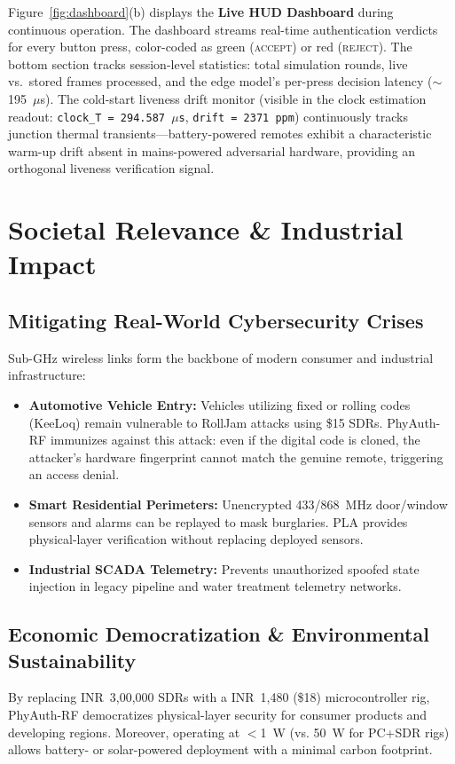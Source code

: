 \documentclass[11pt,a4paper]{article}
\begin{document}
\noindent Figure~\ref{fig:dashboard}(b) displays the \textbf{Live HUD Dashboard} during continuous operation. The dashboard streams real-time authentication verdicts for every button press, color-coded as green (\textsc{accept}) or red (\textsc{reject}). The bottom section tracks session-level statistics: total simulation rounds, live vs.\ stored frames processed, and the edge model's per-press decision latency ($\sim$195~$\mu$s). The cold-start liveness drift monitor (visible in the clock estimation readout: \texttt{clock\_T = 294.587~$\mu$s}, \texttt{drift = 2371~ppm}) continuously tracks junction thermal transients—battery-powered remotes exhibit a characteristic warm-up drift absent in mains-powered adversarial hardware, providing an orthogonal liveness verification signal.

\section{Societal Relevance \& Industrial Impact}
\subsection{Mitigating Real-World Cybersecurity Crises}
Sub-GHz wireless links form the backbone of modern consumer and industrial infrastructure:
\begin{itemize}\setlength\itemsep{0.1em}
    \item \textbf{Automotive Vehicle Entry:} Vehicles utilizing fixed or rolling codes (KeeLoq) remain vulnerable to RollJam attacks using \$15 SDRs. PhyAuth-RF immunizes against this attack: even if the digital code is cloned, the attacker's hardware fingerprint cannot match the genuine remote, triggering an access denial.
    \item \textbf{Smart Residential Perimeters:} Unencrypted 433/868~MHz door/window sensors and alarms can be replayed to mask burglaries. PLA provides physical-layer verification without replacing deployed sensors.
    \item \textbf{Industrial SCADA Telemetry:} Prevents unauthorized spoofed state injection in legacy pipeline and water treatment telemetry networks.
\end{itemize}

\subsection{Economic Democratization \& Environmental Sustainability}
By replacing INR~3,00,000 SDRs with a INR~1,480 (\$18) microcontroller rig, PhyAuth-RF democratizes physical-layer security for consumer products and developing regions. Moreover, operating at $<$1~W (vs. 50~W for PC+SDR rigs) allows battery- or solar-powered deployment with a minimal carbon footprint.
\end{document}

